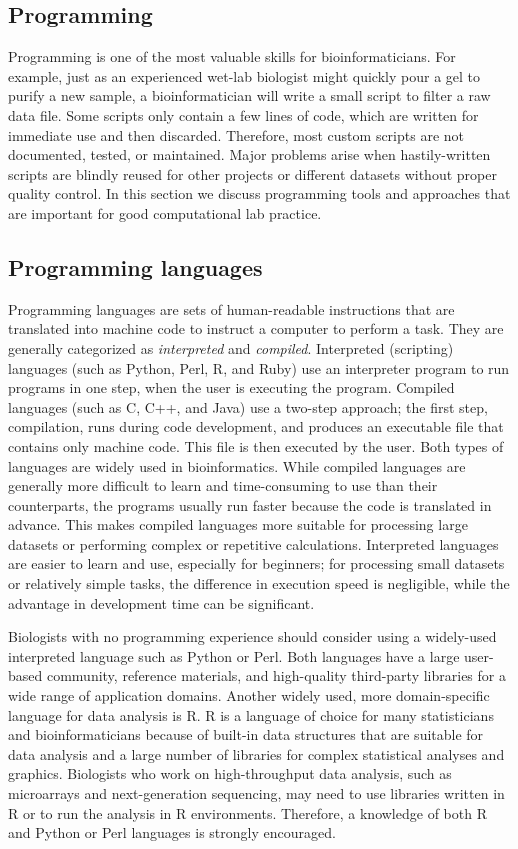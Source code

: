 \documentclass[ChapterTOCs,krantz2]{krantz} %
\begin{document}
\subsection{Programming} Programming is one of the most valuable skills for 
bioinformaticians. For example, just
as an experienced wet-lab biologist might quickly pour a gel to
purify a new sample, a bioinformatician will write a small
script to filter a raw data file. Some scripts only contain a few
lines of code, which are written for immediate use and then discarded.  
Therefore, most custom scripts are not documented, tested, or 
maintained.  Major problems arise when hastily-written scripts are blindly
reused for other projects or different datasets without proper quality control.  In
this section we discuss programming tools and approaches that are 
important for good computational lab practice.

\subsection{Programming languages}

Programming languages are sets of human-readable instructions that are translated into
machine code to instruct a computer to perform a task.
They are generally categorized as \emph{interpreted} and \emph{compiled}.
Interpreted (scripting) languages (such as Python, Perl, R, and Ruby) use an
interpreter program to run programs in one step, 
when the user is executing the
program. Compiled languages (such as C, C++, and Java)
use a two-step approach; the first step, compilation, runs 
during code development, and produces an executable file that
contains only machine code. This file is then executed by the user. 
Both types of languages are widely used in
bioinformatics. While compiled languages are generally more difficult to learn
and time-consuming to use than their counterparts, the 
programs usually run faster because the code is translated in advance.
This makes compiled languages more suitable for processing large
datasets or performing complex or repetitive calculations. Interpreted languages are
easier to learn and use, especially for beginners; for processing 
small datasets or relatively simple
tasks, the difference in execution speed is negligible, while the advantage
in development time can be significant.

Biologists with no programming experience should consider using a widely-used 
interpreted language such as Python or Perl.
Both languages have a large user-based community, reference materials, and
high-quality third-party libraries for a wide range of application domains.
Another widely used, more domain-specific language for data analysis is R.
R is a language of choice for many statisticians and bioinformaticians because of
built-in data structures that are suitable for data analysis and a large number of
libraries for complex statistical analyses and graphics.
Biologists who work on high-throughput data analysis, such as microarrays and next-generation
sequencing, may need to use libraries written in R or to run the analysis in R environments.
Therefore, a knowledge of both R and Python or Perl languages is strongly encouraged.
\end{document}
